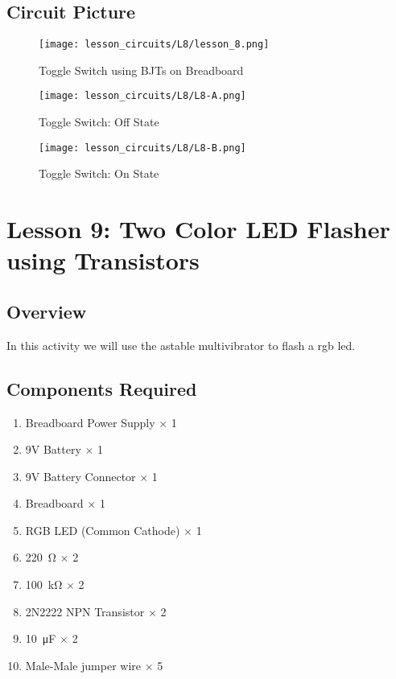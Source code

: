 \subsection{Circuit Picture}
\begin{figure}[htp]
    \centering
    \texttt{[image: lesson\_circuits/L8/lesson\_8.png]}
    \caption{Toggle Switch using BJTs on Breadboard}
    \label{fig:toggle_bjt_sch}
\end{figure}
\begin{figure}[htp]
    \centering
    \texttt{[image: lesson\_circuits/L8/L8-A.png]}
    \caption{Toggle Switch: Off State}
    \label{fig:toggle_bjt_obb1}
\end{figure}
\begin{figure}[htp]
    \centering
    \texttt{[image: lesson\_circuits/L8/L8-B.png]}
    \caption{Toggle Switch: On State}
    \label{fig:toggle_bjt_obb2}
\end{figure}



\section{Lesson 9: Two Color LED Flasher using Transistors}
\subsection{Overview}
In this activity we will use the astable multivibrator to flash a rgb led.
\subsection{Components Required}
\begin{enumerate}
    \item Breadboard Power Supply $\times$ 1
    \item 9V Battery $\times$ 1
    \item 9V Battery Connector $\times$ 1
    \item Breadboard $\times$ 1
    \item RGB LED (Common Cathode) $\times$ 1
    \item \SI{220}{\ohm} $\times$ 2
    \item \SI{100}{\kilo\ohm} $\times$ 2
    \item 2N2222 NPN Transistor $\times$ 2
    \item \SI{10}{\micro\farad} $\times$ 2
    \item Male-Male jumper wire $\times$ 5
\end{enumerate}
